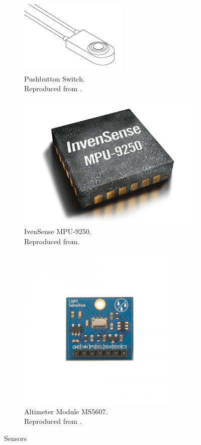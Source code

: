 \documentclass[10pt, a4paper]{article}
\begin{document}
\begin{figure}[H]
\begin{subfigure}{0.5\textwidth}
\includegraphics[scale=0.3]{3.png}
\caption{Pushbutton Switch.\\
Reproduced from \cite{cpi}.}
\label{fig:p}
\end{subfigure}
\begin{subfigure}{0.5\textwidth}
\centering
\includegraphics[scale=0.1]{2.png}
\caption{IvenSense MPU-9250.\\
Reproduced from\cite{iven}.}
\label{fig:att}
\end{subfigure}
\begin{subfigure}{0.5\textwidth}
\centering
\includegraphics[scale=0.3]{1.png}
\caption{Altimeter Module MS5607.\\ Reproduced from \cite{par}.}
\label{fig:pres}
\end{subfigure}
\caption{Sensors}
\label{fig:sensors}
\end{figure}
\end{document}
